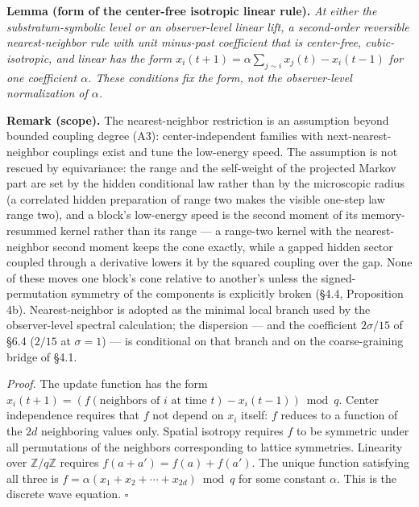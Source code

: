 \documentclass[
]{article}
\begin{document}
\textbf{Lemma (form of the center-free isotropic linear rule).} \emph{At
either the substratum-symbolic level or an observer-level linear lift, a
second-order reversible nearest-neighbor rule with unit minus-past
coefficient that is center-free, cubic-isotropic, and linear has the
form \(x_i(t+1)=\alpha\sum_{j\sim i}x_j(t)-x_i(t-1)\) for one
coefficient \(\alpha\). These conditions fix the form, not the
observer-level normalization of \(\alpha\).}

\textbf{Remark (scope).} The nearest-neighbor restriction is an
assumption beyond bounded coupling degree (A3): center-independent
families with next-nearest-neighbor couplings exist and tune the
low-energy speed. The assumption is not rescued by equivariance: the
range and the self-weight of the projected Markov part are set by the
hidden conditional law rather than by the microscopic radius (a
correlated hidden preparation of range two makes the visible one-step
law range two), and a block's low-energy speed is the second moment of
its memory-resummed kernel rather than its range --- a range-two kernel
with the nearest-neighbor second moment keeps the cone exactly, while a
gapped hidden sector coupled through a derivative lowers it by the
squared coupling over the gap. None of these moves one block's cone
relative to another's unless the signed-permutation symmetry of the
components is explicitly broken (§4.4, Proposition 4b). Nearest-neighbor
is adopted as the minimal local branch used by the observer-level
spectral calculation; the dispersion --- and the coefficient
\(2\sigma/15\) of §6.4 (\(2/15\) at \(\sigma = 1\)) --- is conditional
on that branch and on the coarse-graining bridge of §4.1.

\emph{Proof.} The update function has the form
\(x_i(t+1) = (f(\text{neighbors of } i \text{ at time } t) - x_i(t-1)) \bmod q\).
Center independence requires that \(f\) not depend on \(x_i\) itself:
\(f\) reduces to a function of the \(2d\) neighboring values only.
Spatial isotropy requires \(f\) to be symmetric under all permutations
of the neighbors corresponding to lattice symmetries. Linearity over
\(\mathbb{Z}/q\mathbb{Z}\) requires \(f(a + a') = f(a) + f(a')\). The
unique function satisfying all three is
\(f = \alpha(x_1 + x_2 + \cdots + x_{2d}) \bmod q\) for some constant
\(\alpha\). This is the discrete wave equation. \(\square\)
\end{document}
